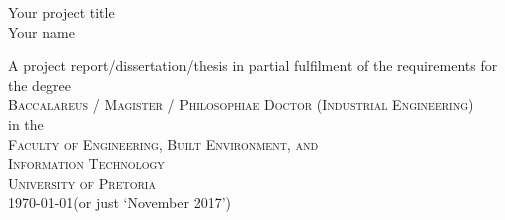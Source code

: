 \thispagestyle{empty}
\begin{center}
{\huge Your project title}
\vspace{20mm} \\
{\Large Your name}
\vfill

A project report/dissertation/thesis in partial fulfilment of the requirements for the degree \\
\vspace{10mm}
{\Large \textsc{Baccalareus / Magister / Philosophiae Doctor (Industrial Engineering)}} \\
\vfill
%
in the \\
\vspace{20mm}
%
{\Large \textsc{Faculty of Engineering, Built Environment, and \\ 
Information Technology}}\\
%
\vspace{10mm}
{\Large\textsc{University of Pretoria}} \\
%
\vfill
%
\today (or just `November 2017')
\end{center}
